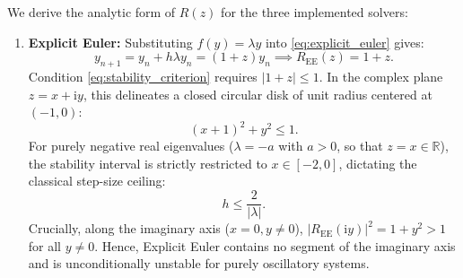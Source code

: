 \documentclass[11pt,a4paper]{article}
\theoremstyle{definition}
\theoremstyle{remark}
\begin{document}
We derive the analytic form of $R(z)$ for the three implemented solvers:
\begin{enumerate}
    \item \textbf{Explicit Euler:} Substituting $f(y) = \lambda y$ into \eqref{eq:explicit_euler} gives:
    \begin{equation}
    \label{eq:R_EE}
    y_{n+1} = y_n + h\lambda y_n = (1 + z) y_n \implies R_{\mathrm{EE}}(z) = 1 + z.
    \end{equation}
    Condition \eqref{eq:stability_criterion} requires $|1 + z| \le 1$. In the complex plane $z = x + \mathrm{i}y$, this delineates a closed circular disk of unit radius centered at $(-1, 0)$:
    \begin{equation}
    \label{eq:EE_boundary}
    (x + 1)^2 + y^2 \le 1.
    \end{equation}
    For purely negative real eigenvalues ($\lambda = -a$ with $a > 0$, so that $z=x\in\mathbb{R}$), the stability interval is strictly restricted to $x \in [-2, 0]$, dictating the classical step-size ceiling:
    \begin{equation}
    \label{eq:h_crit_EE}
    h \le \frac{2}{|\lambda|}.
    \end{equation}
    Crucially, along the imaginary axis ($x = 0, y \ne 0$), $|R_{\mathrm{EE}}(\mathrm{i}y)|^2 = 1 + y^2 > 1$ for all $y \ne 0$. Hence, Explicit Euler contains no segment of the imaginary axis and is unconditionally unstable for purely oscillatory systems.


\end{enumerate}
\end{document}
